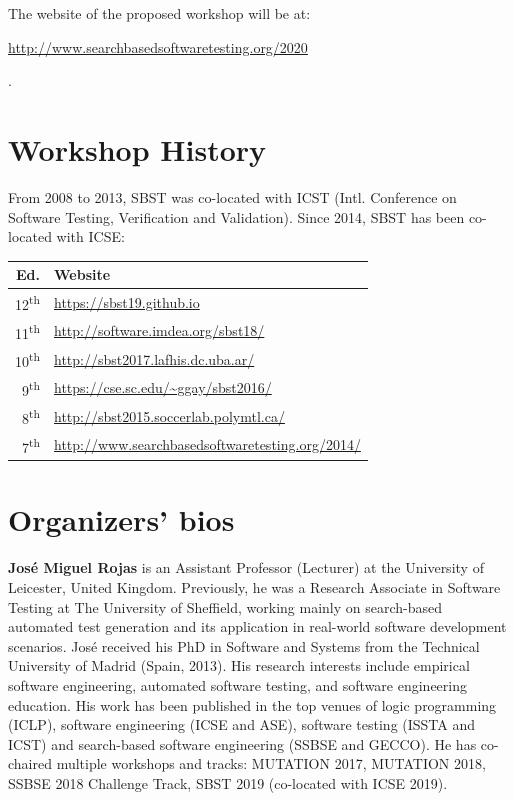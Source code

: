 \documentclass[sigconf,review]{acmart}
\newcommand{\TODO}[1]{\textbf{\textcolor{ScarletRed}{[TODO: #1]}}\xspace}
\newcommand{\TODO}[1]{}
\begin{document}
The website of the proposed workshop will be at:\\\centerline{\url{http://www.searchbasedsoftwaretesting.org/2020}}.

\section{Workshop History}

From 2008 to 2013, SBST was co-located with ICST (Intl. Conference on
Software Testing, Verification and Validation). Since 2014, SBST has
been co-located with ICSE:%
\begin{table}[h]
\centering
\begin{tabular}{rl}\toprule
Ed. & Website \\\midrule
12\textsuperscript{th} & \url{https://sbst19.github.io} \\
11\textsuperscript{th} & \url{http://software.imdea.org/sbst18/} \\
10\textsuperscript{th} & \url{http://sbst2017.lafhis.dc.uba.ar/} \\
9\textsuperscript{th}  & \url{https://cse.sc.edu/~ggay/sbst2016/} \\
8\textsuperscript{th}  & \url{http://sbst2015.soccerlab.polymtl.ca/} \\
7\textsuperscript{th}  & \url{http://www.searchbasedsoftwaretesting.org/2014/}\\\bottomrule
\end{tabular}
\end{table}


\section{Organizers’ bios}

{\bf Jos\'e Miguel Rojas} is an Assistant Professor (Lecturer) at the
University of Leicester, United Kingdom. Previously, he was a Research
Associate in Software Testing at The University of Sheffield, working
mainly on search-based automated test generation and its application
in real-world software development scenarios. Jos\'e received his PhD
in Software and Systems from the Technical University of Madrid
(Spain, 2013). His research interests include empirical software
engineering, automated software testing, and software engineering
education. His work has been published in the top venues of logic
programming (ICLP), software engineering (ICSE and ASE), software
testing (ISSTA and ICST) and search-based software engineering (SSBSE
and GECCO). He has co-chaired multiple workshops and tracks: MUTATION
2017, MUTATION 2018, SSBSE 2018 Challenge Track, SBST 2019 (co-located
with ICSE 2019).
\end{document}
